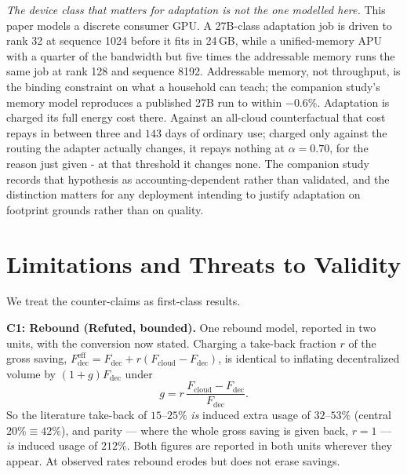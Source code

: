 \documentclass[conference]{IEEEtran}
\begin{document}
\emph{The device class that matters for adaptation is not the one modelled
here.} This paper models a discrete consumer GPU. A 27B-class adaptation job is
driven to rank 32 at sequence 1024 before it fits in 24\,GB, while a
unified-memory APU with a quarter of the bandwidth but five times the
addressable memory runs the same job at rank 128 and sequence 8192. Addressable
memory, not throughput, is the binding constraint on what a household can teach;
the companion study's memory model reproduces a published 27B run to within
$-0.6\%$. Adaptation is charged its full energy cost there. Against an
all-cloud counterfactual that cost repays in between three and $143$ days of
ordinary use; charged only against the routing the adapter actually changes, it
repays nothing at $\alpha = 0.70$, for the reason just given - at that threshold
it changes none. The companion study records that hypothesis as
accounting-dependent rather than validated, and the distinction matters for any
deployment intending to justify adaptation on footprint grounds rather than on
quality.

\section{Limitations and Threats to Validity}
\label{sec:threats}
We treat the counter-claims as first-class results.

\textbf{C1: Rebound (Refuted, bounded).} One rebound model, reported in two
units, with the conversion now stated. Charging a take-back fraction $r$ of the
gross saving, $F^{\text{eff}}_{\text{dec}} = F_{\text{dec}} + r(F_{\text{cloud}}
- F_{\text{dec}})$, is identical to inflating decentralized volume by
$(1+g)F_{\text{dec}}$ under
\begin{equation}
g = r\,\frac{F_{\text{cloud}} - F_{\text{dec}}}{F_{\text{dec}}}.
\label{eq:rebound-units}
\end{equation}
So the literature take-back of $15$--$25\%$ \cite{luccioni2025} \emph{is}
induced extra usage of $32$--$53\%$ (central $20\% \equiv 42\%$), and parity ---
where the whole gross saving is given back, $r=1$ --- \emph{is} induced usage of
$212\%$. Both figures are reported in both units wherever they appear. At
observed rates
rebound erodes but does not erase savings.
\end{document}

